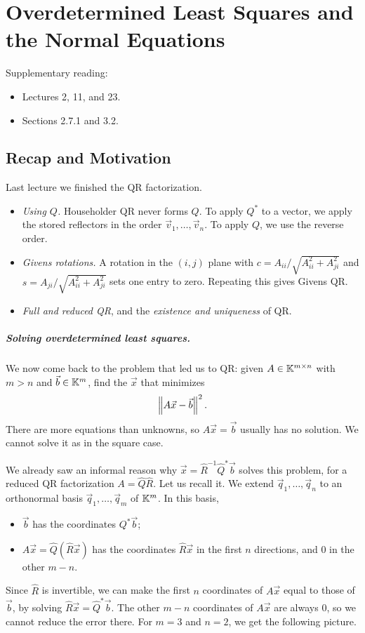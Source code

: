 \chapter{Overdetermined Least Squares and the Normal Equations}
\label{ch:normal}

Supplementary reading:
\begin{itemize}
  \item \cite{TB} Lectures 2, 11, and 23.
  \item \cite{Demmel} Sections 2.7.1 and 3.2.
\end{itemize}

\section{Recap and Motivation}

Last lecture we finished the QR factorization.
\begin{itemize}
  \item \emph{Using $Q$.} Householder QR never forms $Q$. To apply $Q^\ast$ to a vector, we apply the stored reflectors in the order $\vec{v}_1, \dots, \vec{v}_n$. To apply $Q$, we use the reverse order.
  \item \emph{Givens rotations.} A rotation in the $(i, j)$ plane with $c = A_{ii}/\sqrt{A_{ii}^2 + A_{ji}^2}$ and $s = A_{ji}/\sqrt{A_{ii}^2 + A_{ji}^2}$ sets one entry to zero. Repeating this gives Givens QR.
  \item \emph{Full and reduced QR}, and the \emph{existence and uniqueness} of QR.
\end{itemize}

\paragraph{Solving overdetermined least squares.} We now come back to the problem that led us to QR: given $A \in \mathbb{K}^{m \times n}$ with $m > n$ and $\vec{b} \in \mathbb{K}^m$, find the $\vec{x}$ that minimizes
\begin{equation}
  \left\lVert A\vec{x} - \vec{b} \right\rVert^2.
\end{equation}
There are more equations than unknowns, so $A\vec{x} = \vec{b}$ usually has no solution. We cannot solve it as in the square case.

We already saw an informal reason why $\vec{x} = \hat{R}^{-1}\hat{Q}^\ast\vec{b}$ solves this problem, for a reduced QR factorization $A = \hat{Q}\hat{R}$. Let us recall it. We extend $\vec{q}_1, \dots, \vec{q}_n$ to an orthonormal basis $\vec{q}_1, \dots, \vec{q}_m$ of $\mathbb{K}^m$. In this basis,
\begin{itemize}
  \item $\vec{b}$ has the coordinates $Q^\ast\vec{b}$;
  \item $A\vec{x} = \hat{Q}(\hat{R}\vec{x})$ has the coordinates $\hat{R}\vec{x}$ in the first $n$ directions, and $0$ in the other $m - n$.
\end{itemize}
Since $\hat{R}$ is invertible, we can make the first $n$ coordinates of $A\vec{x}$ equal to those of $\vec{b}$, by solving $\hat{R}\vec{x} = \hat{Q}^\ast\vec{b}$. The other $m - n$ coordinates of $A\vec{x}$ are always $0$, so we cannot reduce the error there. For $m = 3$ and $n = 2$, we get the following picture.

